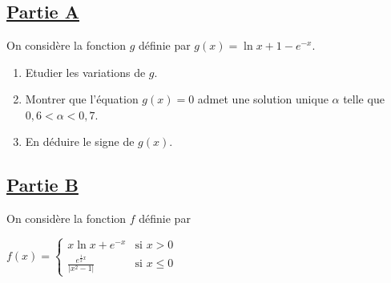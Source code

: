 \documentclass[12pt,a4paper]{article}
\begin{document}
\section*{ }

\subsection*{\underline{\textbf{Partie A}}}

On considère la fonction \( g \) définie par  
\( g(x) = \ln x + 1 - e^{-x} \).

\begin{enumerate}
    \item Etudier les variations de \( g \).
    \item Montrer que l’équation \( g(x) = 0 \) admet une solution unique \( \alpha \) telle que \( 0,6 < \alpha < 0,7 \).
    \item En déduire le signe de \( g(x) \).
\end{enumerate}

\subsection*{\underline{\textbf{Partie B}}}

On considère la fonction \( f \) définie par  

\(
f(x) =
\begin{cases}
    x \ln x + e^{-x} & \text{si } x > 0 \\
    \frac{e^{\frac{1}{2} x}}{|x^2 - 1|} & \text{si } x \leq 0
\end{cases}
\)
\end{document}
